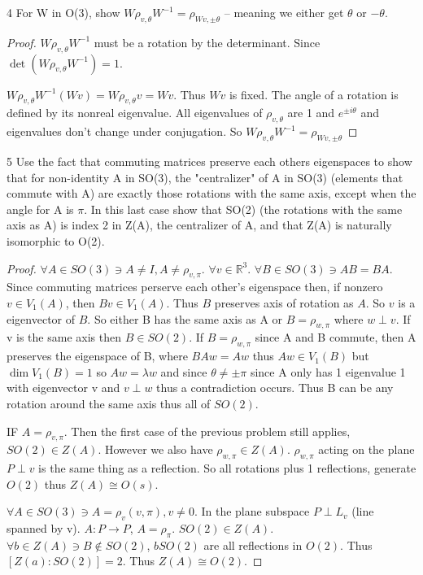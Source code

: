 \documentclass{article}
\newcommand{\R}{\mathbb{R}}
\begin{document}
\bigskip

\begin{claim}{4}
    For W in O(3), show $W \rho_{v,\theta} W^{-1} = \rho_{Wv, \pm \theta}$ -- meaning we either get $\theta$ or $-\theta$. 
\end{claim}
\begin{proof}
    $W \rho_{v, \theta} W^{-1}$ must be a rotation by the determinant. Since $\det(W \rho_{v, \theta} W^{-1}) = 1$.

    $W \rho_{v, \theta} W^{-1}(Wv) = W \rho_{v, \theta} v = Wv$. Thus $Wv$ is fixed. The angle of a rotation is defined by its nonreal eigenvalue. All eigenvalues of $\rho_{v, \theta}$ are 1 and $e^{\pm i \theta}$ and eigenvalues don't change under conjugation. So $W \rho_{v, \theta} W^{-1} = \rho_{Wv, \pm \theta}$
\end{proof}

\bigskip

\begin{claim}{5}
    Use the fact that commuting matrices preserve each others eigenspaces to show that for non-identity A in SO(3), the "centralizer" of A in SO(3) (elements that commute with A) are exactly those rotations with the same axis, except when the angle for A is $\pi$. In this last case show that SO(2) (the rotations with the same axis as A) is index 2 in Z(A), the centralizer of A, and that Z(A) is naturally isomorphic to O(2). 
\end{claim}
\begin{proof}
    $\forall A \in SO(3) \ni A \neq I, A \neq \rho_{v, \pi}.$  $\forall v \in \R^3$. $\forall B \in SO(3) \ni AB = BA$. Since commuting matrices perserve each other's eigenspace then, if nonzero $v \in V_1(A)$, then $Bv \in V_1(A)$. Thus $B$ preserves axis of rotation as $A$. So $v$ is a eigenvector of $B$. So either B has the same axis as A or $B = \rho_{w, \pi}$ where $w \perp v$. If v is the same axis then $B \in SO(2)$. If $B = \rho_{w, \pi}$ since A and B commute, then A preserves the eigenspace of B, where $BAw = Aw$ thus $Aw \in V_1(B)$ but $\dim V_1(B) = 1$ so $Aw = \lambda w$ and since $\theta \neq \pm \pi$ since A only has 1 eigenvalue 1 with eigenvector v and $v \perp w$  thus a contradiction occurs. Thus B can be any rotation around the same axis thus all of $SO(2)$.

    IF $A = \rho_{v, \pi}$. Then the first case of the previous problem still applies, $SO(2) \in Z(A)$. However we also have $\rho_{w, \pi} \in Z(A)$. $\rho_{w, \pi}$ acting on the plane $P \perp v$ is the same thing as a reflection. So all rotations plus 1 reflections, generate $O(2)$ thus $Z(A) \cong O(s)$.    


    $\forall A \in SO(3) \ni A = \rho_v(v, \pi), v \neq 0$. In the plane subspace $P \perp L_v$ (line spanned by v). $A: P \to P$, $A = \rho_\pi$. $SO(2) \in Z(A)$. $\forall b \in Z(A) \ni B \not \in SO(2)$, $bSO(2)$ are all reflections in $O(2)$. Thus $[Z(a) : SO(2)] = 2$. Thus $Z(A) \cong O(2)$.   
\end{proof}
\end{document}
